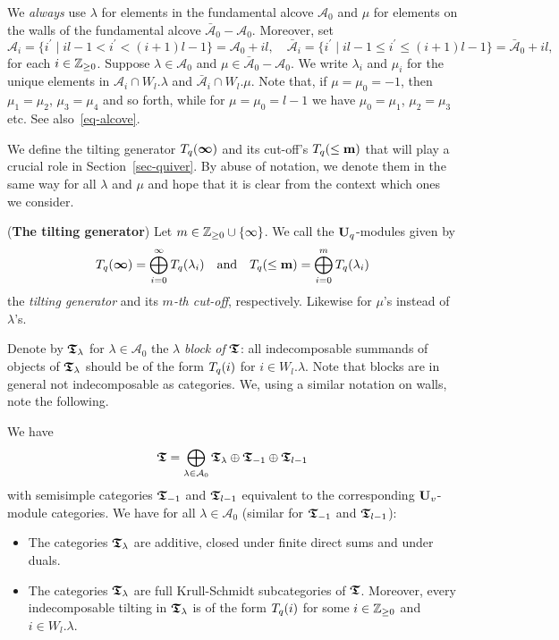 \begin{nota}\label{no-link}
We \textit{always} use $\lambda$ for 
elements in the fundamental alcove 
$\mathcal{A}_0$ and $\mu$ for elements 
on the walls of the fundamental alcove 
$\bar{\mathcal A}_0-\mathcal A_0$. Moreover, set 
\[
\mathcal A_i=\{i^{\prime}\mid il-1<i^{\prime}<(i+1)l-1\}=\mathcal A_0+il,\quad
\bar{\mathcal A}_i=\{i^{\prime}\mid il-1\leq i^{\prime}\leq (i+1)l-1\}=\bar{\mathcal A}_0+il,
\] 
for each $i\in\mathbb{Z}_{\geq 0}$. Suppose $\lambda\in\mathcal A_0$ 
and $\mu\in\bar{\mathcal A}_0-\mathcal A_0$. We write 
$\lambda_i$ and $\mu_i$ for the unique elements in 
$\mathcal A_i\cap W_l.\lambda$ and $\bar{\mathcal A}_i\cap W_l.\mu$. 
Note that, if $\mu=\mu_0=-1$, then $\mu_1=\mu_2$, $\mu_3=\mu_4$ and so 
forth, while for $\mu=\mu_0=l-1$ 
we have $\mu_0=\mu_1$, $\mu_2=\mu_3$ etc. See also~\eqref{eq-alcove}.
\end{nota}



We define the tilting generator $T_q({\boldsymbol{\infty}})$ and 
its cut-off's $T_q({\leq \boldsymbol{\mathrm{m}}})$ that will play a 
crucial role in Section~\ref{sec-quiver}. By 
abuse of notation, we denote them in the same 
way for all $\lambda$ and $\mu$ and hope that 
it is clear from the context which ones we consider.


\begin{defn}(\textbf{The tilting generator})\label{defn-tiltgen}
Let $m\in\mathbb{Z}_{\geq 0}\cup\{\infty\}$. We call the $\boldsymbol{\mathrm{U}}_q$-modules given by
\[
T_q({\boldsymbol{\infty}})=\bigoplus_{i=0}^{\infty}T_q({\lambda_i})\quad\text{and}\quad T_q({\leq \boldsymbol{\mathrm{m}}})=\bigoplus_{i=0}^mT_q({\lambda_i})
\] 
the \textit{tilting generator} and its \textit{$m$-th cut-off}, respectively. 
Likewise for $\mu$'s instead of $\lambda$'s.
\end{defn}



Denote by $\boldsymbol{\mathfrak{T}}_{\lambda}$ for $\lambda\in\mathcal A_0$ 
the $\lambda$ \textit{block of} $\boldsymbol{\mathfrak{T}}$: all indecomposable summands of 
objects of $\boldsymbol{\mathfrak{T}}_{\lambda}$ should be of 
the form $T_q({i})$ for $i\in W_l.\lambda$. Note that 
blocks are in general not indecomposable as categories.
We, using a similar notation on walls, note the following.



\begin{lem}\label{lem-block}
We have
\[
\boldsymbol{\mathfrak{T}}=\bigoplus_{\lambda\in\mathcal A_0}\boldsymbol{\mathfrak{T}}_{\lambda}\oplus \boldsymbol{\mathfrak{T}}_{-1}\oplus \boldsymbol{\mathfrak{T}}_{l-1}
\]
with semisimple categories 
$\boldsymbol{\mathfrak{T}}_{-1}$ and $\boldsymbol{\mathfrak{T}}_{l-1}$ equivalent 
to the corresponding $\boldsymbol{\mathrm{U}}_v$-module categories. 
We have for all $\lambda\in\mathcal A_0$
(similar for $\boldsymbol{\mathfrak{T}}_{-1}$ and $\boldsymbol{\mathfrak{T}}_{l-1}$):
\begin{itemize}
\item[(a)] The categories $\boldsymbol{\mathfrak{T}}_{\lambda}$ 
are additive, closed under finite direct sums and under duals.
\item[(b)] The categories $\boldsymbol{\mathfrak{T}}_{\lambda}$ 
are full Krull-Schmidt subcategories of $\boldsymbol{\mathfrak{T}}$. 
Moreover, every indecomposable tilting 
in $\boldsymbol{\mathfrak{T}}_{\lambda}$ is of the form $T_q({i})$ for some $i\in\mathbb{Z}_{\geq 0}$ and $i\in W_l.\lambda$.\makeqed
\end{itemize}
\end{lem}


